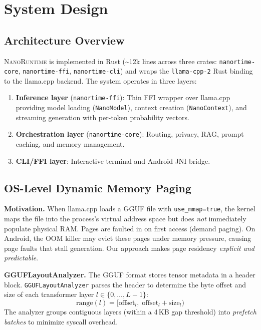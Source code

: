 \documentclass[11pt]{article}
\newcommand{\nanort}{\textsc{NanoRuntime}}
\begin{document}
\section{System Design}
\label{sec:design}

\subsection{Architecture Overview}
\label{sec:arch}

\nanort{} is implemented in Rust (\textasciitilde{}12k lines across three
crates: \texttt{nanortime-core}, \texttt{nanortime-ffi},
\texttt{nanortime-cli}) and wraps the
\texttt{llama-cpp-2} Rust binding to the llama.cpp backend.
The system operates in three layers:

\begin{enumerate}
  \item \textbf{Inference layer} (\texttt{nanortime-ffi}):
    Thin FFI wrapper over llama.cpp providing model loading
    (\texttt{NanoModel}), context creation (\texttt{NanoContext}),
    and streaming generation with per-token probability vectors.
  \item \textbf{Orchestration layer} (\texttt{nanortime-core}):
    Routing, privacy, RAG, prompt caching, and memory management.
  \item \textbf{CLI/FFI layer}: Interactive terminal and Android JNI bridge.
\end{enumerate}

\subsection{OS-Level Dynamic Memory Paging}
\label{sec:paging}

\textbf{Motivation.}
When llama.cpp loads a GGUF file with \texttt{use\_mmap=true},
the kernel maps the file into the process's virtual address space
but does \emph{not} immediately populate physical RAM.
Pages are faulted in on first access (demand paging).
On Android, the OOM killer may evict these pages under memory pressure,
causing page faults that stall generation.
Our approach makes page residency \emph{explicit and predictable}.

\textbf{GGUFLayoutAnalyzer.}
The GGUF format stores tensor metadata in a header block.
\texttt{GGUFLayoutAnalyzer} parses the header to determine the byte
offset and size of each transformer layer $l \in \{0, \ldots, L{-}1\}$:
\begin{equation}
  \text{range}(l) = [\text{offset}_l,\; \text{offset}_l + \text{size}_l)
  \label{eq:layout}
\end{equation}
The analyzer groups contiguous layers (within a 4\,KB gap threshold)
into \emph{prefetch batches} to minimize syscall overhead.
\end{document}
